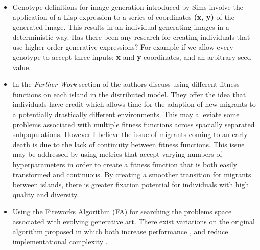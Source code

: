 \documentclass[10pt,a4paper]{article}
\begin{document}
\begin{itemize}
	\item Genotype definitions for image generation introduced by Sims \cite{sims} involve the application of a Lisp expression to a series of coordinates \textbf{(x, y)} of the generated image.
	This results in an individual generating images in a deterministic way.
	Has there been any research for creating individuals that use higher order generative expressions?
	For example if we allow every genotype to accept three inputs: \textbf{x} and \textbf{y} coordinates, and an arbitrary seed value.
	
	\item In the \textit{Further Work} section of \cite{distributed-evolutionary-art} the authors discuss using different fitness functions on each island in the distributed model.
	They offer the idea that individuals have credit which allows time for the adaption of new migrants to a potentially drastically different environments.
	This may alleviate some problems associated with multiple fitness functions across spacially separated subpopulations.
	However I believe the issue of migrants coming to an early death is due to the lack of continuity between fitness functions.
	This issue may be addressed by using metrics that accept varying numbers of hyperparameters in order to create a fitness function that is both easily transformed and continuous.
	By creating a smoother transition for migrants between islands, there is greater fixation potential for individuals with high quality and diversity.
	
	\item Using the Fireworks Algorithm (FA) \cite{fireworks} for searching the problems space associated with evolving generative art.
	There exist variations on the original algorithm proposed in \cite{fireworks} which both increase performance \cite{fireworks-adaptive, fireworks-enhanced, fireworks-cooperative}, and reduce implementational complexity \cite{fireworks-bare-bones}.
	
	
\end{itemize}

\pagebreak



\end{document}
